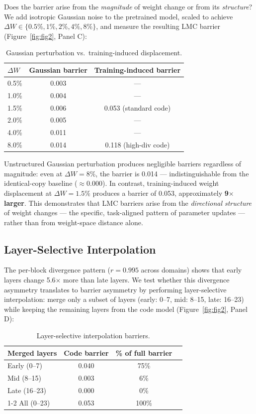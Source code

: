 \documentclass[11pt,a4paper]{article}
\begin{document}
Does the barrier arise from the \emph{magnitude} of weight change or from its \emph{structure}? We add isotropic Gaussian noise to the pretrained model, scaled to achieve $\Delta W \in \{0.5\%, 1\%, 2\%, 4\%, 8\%\}$, and measure the resulting LMC barrier (Figure~\ref{fig:fig2}, Panel C):

\begin{table}[h]
\centering
\caption{Gaussian perturbation vs.\ training-induced displacement.}
\label{tab:gaussian}
\begin{tabular}{@{}lcc@{}}
\toprule
\textbf{$\Delta W$} & \textbf{Gaussian barrier} & \textbf{Training-induced barrier} \\
\midrule
0.5\% & 0.003 & — \\
1.0\% & 0.004 & — \\
1.5\% & 0.006 & 0.053 (standard code) \\
2.0\% & 0.005 & — \\
4.0\% & 0.011 & — \\
8.0\% & 0.014 & 0.118 (high-div code) \\
\bottomrule
\end{tabular}
\end{table}

Unstructured Gaussian perturbation produces negligible barriers regardless of magnitude: even at $\Delta W = 8\%$, the barrier is 0.014 — indistinguishable from the identical-copy baseline ($\approx$0.000). In contrast, training-induced weight displacement at $\Delta W = 1.5\%$ produces a barrier of 0.053, approximately \textbf{9$\times$ larger}. This demonstrates that LMC barriers arise from the \emph{directional structure} of weight changes — the specific, task-aligned pattern of parameter updates — rather than from weight-space distance alone.

\subsection{Layer-Selective Interpolation}\label{sec:layers}

The per-block divergence pattern ($r = 0.995$ across domains) shows that early layers change 5.6$\times$ more than late layers. We test whether this divergence asymmetry translates to barrier asymmetry by performing layer-selective interpolation: merge only a subset of layers (early: 0--7, mid: 8--15, late: 16--23) while keeping the remaining layers from the code model (Figure~\ref{fig:fig2}, Panel D):

\begin{table}[h]
\centering
\caption{Layer-selective interpolation barriers.}
\label{tab:layersel}
\begin{tabular}{@{}lccc@{}}
\toprule
\textbf{Merged layers} & \textbf{Code barrier} & \textbf{\% of full barrier} \\
\midrule
Early (0--7)  & 0.040 & 75\% \\
Mid (8--15)   & 0.003 & 6\% \\
Late (16--23) & 0.000 & 0\% \\
\cmidrule{1-2}
All (0--23)   & 0.053 & 100\% \\
\bottomrule
\end{tabular}
\end{table}
\end{document}
